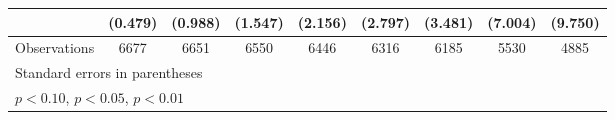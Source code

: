 \begin{table}[htbp]
\begin{tabular}{l*{8}{c}}
                    &     (0.479)         &     (0.988)         &     (1.547)         &     (2.156)         &     (2.797)         &     (3.481)         &     (7.004)         &     (9.750)         \\
\hline
Observations        &        6677         &        6651         &        6550         &        6446         &        6316         &        6185         &        5530         &        4885         \\
\hline\hline
\multicolumn{9}{l}{\footnotesize Standard errors in parentheses}\\
\multicolumn{9}{l}{\footnotesize \sym{*} \(p<0.10\), \sym{**} \(p<0.05\), \sym{***} \(p<0.01\)}\\
\end{tabular}
\end{table}
